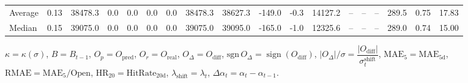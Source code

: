\begin{threeparttable}
{\begin{tabular}{lrrrrrrrrrrrrrrrrr}
Average &     0.13 & 38478.3 &               0.0 &               0.0 &                0.0 &                0.0 & 38478.3 & 38627.3 &     -149.0 &                     -0.3 &             14127.2 &         -- &        -- &             -- &            289.5 &            0.75 &                  17.83 \\
 Median &     0.15 & 39075.0 &               0.0 &               0.0 &                0.0 &                0.0 & 39075.0 & 39095.0 &     -165.0 &                     -1.0 &             12325.6 &         -- &        -- &             -- &            289.0 &            0.74 &                  15.00 \\
\bottomrule
\end{tabular}
}
\begin{tablenotes}\footnotesize
\item $\kappa=\kappa(\sigma)$, $B=B_{t-1}$, $O_p=O_{\text{pred}}$, $O_r=O_{\text{real}}$, $O_\Delta=O_{\text{diff}}$, $\mathrm{sgn}\,O_\Delta=\operatorname{sign}(O_{\text{diff}})$, $|O_\Delta|/\sigma=\dfrac{|O_{\text{diff}}|}{\sigma_t^{\text{shift}}}$, $\mathrm{MAE}_5=\mathrm{MAE}_{5\text{d}}$, $\mathrm{RMAE}= \mathrm{MAE}_5 / \text{Open}$, $\mathrm{HR}_{20}=\mathrm{HitRate}_{20\text{d}}$, 
$\lambda_{\text{shift}}=\lambda_t$, 
$\Delta\alpha_t=\alpha_t-\alpha_{t-1}$.
\end{tablenotes}
\end{threeparttable}
\endgroup

